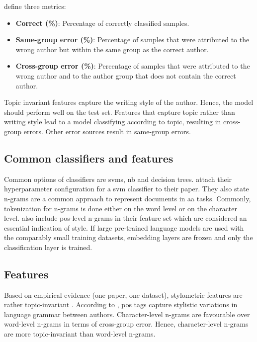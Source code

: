 \citet{altakrori_topic_2021} define three metrics:
\begin{itemize}
    \item \textbf{Correct (\%)}: Percentage of correctly classified samples.
    \item \textbf{Same-group error (\%)}: Percentage of samples that were attributed to the wrong author but within the same group 
    as the correct author.
    \item \textbf{Cross-group error (\%)}: Percentage of samples that were attributed to the wrong author and to the author group 
    that does not contain the correct author.
\end{itemize}

Topic invariant features capture the writing style of the author.
Hence, the model should perform well on the test set.
Features that capture topic rather than writing style lead to a model classifying according to topic, 
resulting in cross-group errors.
Other error sources result in same-group errors.

\subsection{Common classifiers and features}
\label{sec:topic_confusion_classifiers}
Common options of classifiers are \acp{svm}, \ac{nb} and decision trees.
\citet{altakrori_topic_2021} attach their hyperparameter configuration for a \ac{svm} classifier to their paper.
They also state n-grams are a common approach to represent documents in \ac{aa} tasks.
Commonly, tokenization for n-grams is done either on the word level or on the character level.
\citet{altakrori_topic_2021} also include \ac{pos}-level n-grams in their feature set 
which are considered an essential indication of style.
If large pre-trained language models are used with the comparably small training datasets, embedding layers are frozen and 
only the classification layer is trained.

\subsection{Features}
\label{sec:topic_confusion_features}
Based on empirical evidence (one paper, one dataset), stylometric features are rather topic-invariant \cite{altakrori_topic_2021}.
According to \citet{altakrori_topic_2021}, \ac{pos} tags capture stylistic variations in language grammar between authors.
Character-level n-grams are favourable over word-level n-grams in terms of cross-group error.
Hence, character-level n-grams are more topic-invariant than word-level n-grams.

